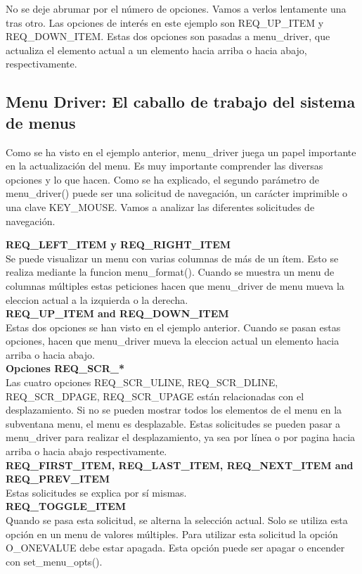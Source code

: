 \documentclass{article}
\begin{document}
No se deje abrumar por el número de opciones. Vamos a verlos lentamente una
tras otro. Las opciones de interés en este ejemplo son REQ\_UP\_ITEM y
REQ\_DOWN\_ITEM. Estas dos opciones son pasadas a menu\_driver, que actualiza el
elemento actual a un elemento hacia arriba o hacia abajo, respectivamente.

\subsection{Menu Driver: El caballo de trabajo del sistema de menus}%
Como se ha visto en el ejemplo anterior, menu\_driver juega un papel importante
en la actualización del menu. Es muy importante comprender las diversas
opciones y lo que hacen. Como se ha explicado, el segundo parámetro de
menu\_driver() puede ser una solicitud de navegación, un carácter imprimible o
una clave KEY\_MOUSE. Vamos a analizar las diferentes solicitudes de navegación.

\textbf{REQ\_LEFT\_ITEM y REQ\_RIGHT\_ITEM}\\
Se puede visualizar un menu con varias columnas de más de un ítem. Esto se
realiza mediante la funcion menu\_format(). Cuando se muestra un menu de
columnas múltiples estas peticiones hacen que menu\_driver de menu mueva la
eleccion actual a la izquierda o la derecha.\\

\textbf{REQ\_UP\_ITEM and REQ\_DOWN\_ITEM}\\
Estas dos opciones se han visto en el ejemplo anterior. Cuando se pasan estas
opciones, hacen que menu\_driver mueva la eleccion actual un elemento hacia
arriba o hacia abajo.\\

\textbf{Opciones REQ\_SCR\_*}\\
Las cuatro opciones REQ\_SCR\_ULINE, REQ\_SCR\_DLINE, REQ\_SCR\_DPAGE,
REQ\_SCR\_UPAGE están relacionadas con el desplazamiento. Si no se pueden
mostrar todos los elementos de el menu en la subventana menu, el menu es
desplazable. Estas solicitudes se pueden pasar a menu\_driver para realizar el
desplazamiento, ya sea por línea o por pagina hacia arriba o hacia abajo
respectivamente.\\

\textbf{REQ\_FIRST\_ITEM, REQ\_LAST\_ITEM, REQ\_NEXT\_ITEM and REQ\_PREV\_ITEM}\\
Estas solicitudes se explica por sí mismas.\\

\textbf{REQ\_TOGGLE\_ITEM}\\
Quando se pasa esta solicitud, se alterna la selección actual. Solo se utiliza
esta opción en un menu de valores múltiples. Para utilizar esta solicitud la
opción O\_ONEVALUE debe estar apagada. Esta opción puede ser apagar o encender
con set\_menu\_opts().\\
\end{document}
